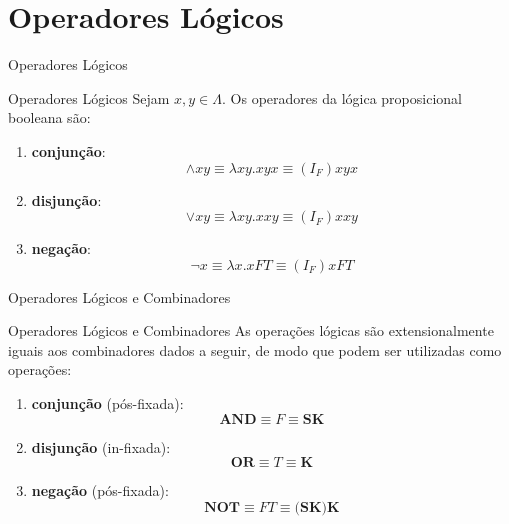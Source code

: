 \section{Operadores Lógicos}

\begin{frame}[fragile]{Operadores Lógicos}

    \begin{block}{Operadores Lógicos}
        Sejam $x, y\in\Lambda$. Os operadores da lógica proposicional booleana são:
        \begin{enumerate}
            \item \textbf{conjunção}:
            \[
                \land xy \equiv \lambda xy.xyx \equiv (I_F) xyx 
            \]

            \item \textbf{disjunção}:
            \[
                \vee xy \equiv \lambda xy.xxy \equiv (I_F) xxy 
            \]

            \item \textbf{negação}:
            \[
                \lnot x \equiv \lambda x.xFT \equiv (I_F) xFT
            \]
        \end{enumerate}
    \end{block}

\end{frame}

\begin{frame}[fragile]{Operadores Lógicos e Combinadores}

    \begin{block}{Operadores Lógicos e Combinadores}
        As operações lógicas são extensionalmente iguais aos combinadores dados a seguir,
        de modo que podem ser utilizadas como operações:
        \begin{enumerate}
            \item \textbf{conjunção} (pós-fixada):
            \[
                \mathbf{AND} \equiv F \equiv \mathbf{SK}
            \]

            \item \textbf{disjunção} (in-fixada):
            \[
                \mathbf{OR} \equiv T \equiv \mathbf{K}
            \]

            \item \textbf{negação} (pós-fixada):
            \[
                \mathbf{NOT} \equiv FT \equiv (\mathbf{SK)}\mathbf{K}
            \]
        \end{enumerate}
    \end{block}

\end{frame}

